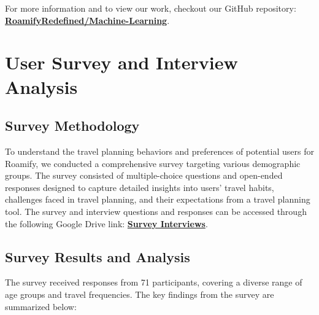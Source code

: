 \documentclass[conference]{IEEEtran}
\begin{document}
        For more information and to view our work, checkout our GitHub repository: \href{https://github.com/RoamifyRedefined/Machine-Learning}{\textbf{RoamifyRedefined/Machine-Learning}}.

\section{User Survey and Interview Analysis}

    \subsection{Survey Methodology}
        To understand the travel planning behaviors and preferences of potential users for Roamify, we conducted a comprehensive survey targeting various demographic groups. The survey consisted of multiple-choice questions and open-ended responses designed to capture detailed insights into users' travel habits, challenges faced in travel planning, and their expectations from a travel planning tool. The survey and interview questions and responses can be accessed through the following Google Drive link: \href{https://drive.google.com/drive/folders/1mKPTXZ7n7ZFmMEK6QBOKU0op3mf8hCta?usp=sharing}{\textbf{Survey Interviews}}.

    \subsection{Survey Results and Analysis}
        The survey received responses from 71 participants, covering a diverse range of age groups and travel frequencies. The key findings from the survey are summarized below:
\end{document}
